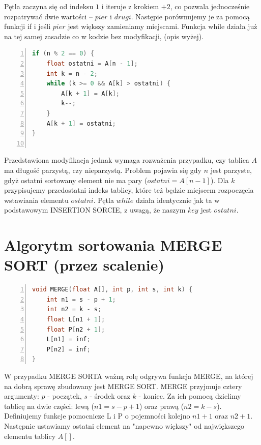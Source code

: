 \documentclass{article}
\begin{document}
\large{Pętla zaczyna się od indeksu \(1\) i iteruje z krokiem \(+2\), co pozwala jednocześnie rozpatrywać dwie wartości – \(pier\) i \(drugi\). Następie porównujemy je za pomocą funkcji if i jeśli \(pier\) jest większy zamieniamy miejscami. Funkcja while działa już na tej samej zasadzie co w kodzie bez modyfikacji, (opis wyżej).}

\newpage

\begin{lstlisting}[language=C++, caption={Fragment 2 funkcji sortującej przez wstawienie z modyfikacją}, numbers=left, frame=single, xleftmargin=20pt, xrightmargin = 1pt]
if (n % 2 == 0) {
	float ostatni = A[n - 1];
	int k = n - 2;
	while (k >= 0 && A[k] > ostatni) {
		A[k + 1] = A[k];
		k--;
	}
	A[k + 1] = ostatni;
}
	
\end{lstlisting}

\large{Przedstawiona modyfikacja jednak wymaga rozważenia przypadku, czy tablica \(A\) ma długość parzystą, czy nieparzystą. Problem pojawia się gdy \(n\) jest parzyste, gdyż ostatni sortowany element nie ma pary (\(ostatni = A[n - 1]\)). Dla \(k\) przypisujemy przedostatni indeks tablicy, które też będzie miejscem rozpoczęcia wstawiania elementu \(ostatni\). Pętla \(while\) działa identycznie jak ta w podstawowym INSERTION SORCIE, z uwagą, że naszym \(key\) jest \(ostatni\).}

	\section{Algorytm sortowania MERGE SORT (przez scalenie)}
	
\begin{lstlisting}[language=C++, caption={Fragment 1 funkcji sortującej przez scalenie bez modyfikacji}, numbers=left, frame=single, xleftmargin=20pt, xrightmargin = 1pt]
void MERGE(float A[], int p, int s, int k) {
	int n1 = s - p + 1;
	int n2 = k - s;
	float L[n1 + 1];
	float P[n2 + 1];
	L[n1] = inf;
	P[n2] = inf;
}
\end{lstlisting}

\large{W przypadku MERGE SORTA ważną rolę odgrywa funkcja MERGE, na której na dobrą sprawę zbudowany jest MERGE SORT. MERGE przyjmuje cztery argumenty: \(p\) - początek, \(s\) - środek oraz \(k\) - koniec. Za ich pomocą dzielimy tablicę na dwie części: lewą (\(n1 = s - p + 1\)) oraz prawą (\(n2 = k - s\)). Definiujemy funkcje pomocnicze L i P o pojemności kolejno \(n1 + 1\) oraz \(n2 + 1\). Następnie ustawiamy ostatni element na "napewno większy" od największego elementu tablicy \(A[]\).}
\end{document}
